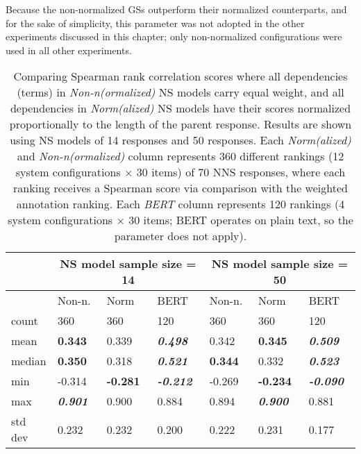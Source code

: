 Because the non-normalized GSs outperform their normalized counterparts, and for the sake of simplicity, this parameter was not adopted in the other experiments discussed in this chapter; only non-normalized configurations were used in all other experiments.
\begin{table}[htb!]
\begin{center}
\begin{tabular}{|l||l|l|l||l|l|l|}
\hline
 & \multicolumn{3}{c||}{NS model sample size = 14} & \multicolumn{3}{c|}{NS model sample size = 50} \\
\hline
		& Non-n. 	& Norm 	& BERT 		& Non-n. 	& Norm 	& BERT 		\\
\hline
\hline
count 	& 360 		& 360 	& 120 		& 360 			& 360 			& 120		 \\
\hline
mean 	& \textbf{0.343} 	& 0.339 & \textit{\textbf{0.498}}		& 0.342 		& \textbf{0.345} 		& \textit{\textbf{0.509}}		 \\
\hline
median 	& \textbf{0.350} 	& 0.318 & \textit{\textbf{0.521}} 	& \textbf{0.344} 		& 0.332 		& \textit{\textbf{0.523}}		 \\
\hline
min 	& -0.314 	& \textbf{-0.281} & \textit{\textbf{-0.212}} 	& -0.269 		& \textbf{-0.234} 		& \textit{\textbf{-0.090}}		 \\
\hline
max		& \textit{\textbf{0.901}} 	& 0.900 & 0.884 	& 0.894 		& \textit{\textbf{0.900}} 		& 0.881		 \\
\hline
std dev & 0.232 	& 0.232 & 0.200 	& 0.222 		& 0.231 		& 0.177		 \\
\hline
\end{tabular}
\caption{\label{tab:term-norm-results} Comparing Spearman rank correlation scores where all dependencies (terms) in \textit{Non-n(ormalized)} NS models carry equal weight, and all dependencies in \textit{Norm(alized)} NS models have their scores normalized proportionally to the length of the parent response. Results are shown using NS models of 14 responses and 50 responses. Each \textit{Norm(alized)} and \textit{Non-n(ormalized)} column represents 360 different rankings (12 system configurations $\times$ 30 items) of 70 NNS responses, where each ranking receives a Spearman score via comparison with the weighted annotation ranking. Each \textit{BERT} column represents 120 rankings (4 system configurations $\times$ 30 items; BERT operates on plain text, so the  parameter does not apply).
}
\end{center}
\end{table}


